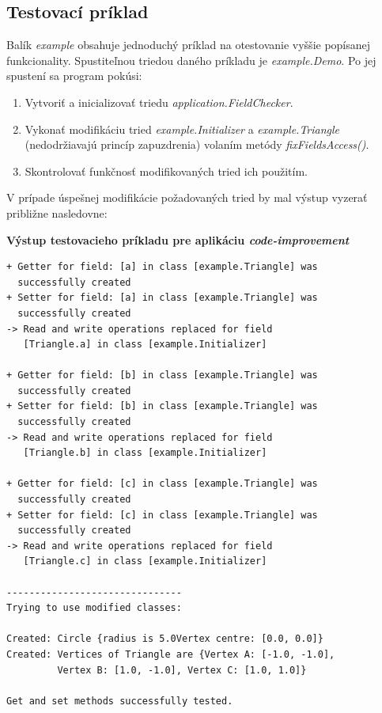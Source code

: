 \documentclass[11pt,final,oneside]{fithesis}
\newenvironment{example}[1]
{
\vspace{3mm}
\noindent\textbf{#1}
\vspace{2mm}
}
{
\vspace{3mm}
}
\begin{document}
\subsection{Testovací príklad}
Balík \textit{example} obsahuje jednoduchý príklad na otestovanie vyššie 
popísanej funkcionality. Spustiteľnou triedou daného príkladu je 
\textit{example.Demo}. Po jej spustení sa program pokúsi:

\begin{enumerate}
\item Vytvoriť a inicializovať triedu \textit{application.FieldChecker}.
\item Vykonať modifikáciu tried \textit{example.Initializer} a 
\textit{example.Triangle} (nedodržiavajú princíp zapuzdrenia) volaním metódy 
\textit{fixFieldsAccess()}.
\item Skontrolovať funkčnosť modifikovaných tried ich použitím.
\end{enumerate}

V prípade úspešnej modifikácie požadovaných tried by mal výstup vyzerať približne nasledovne:

\begin{example}{Výstup testovacieho príkladu pre aplikáciu
\textit{code-improvement}}
\begin{verbatim}
+ Getter for field: [a] in class [example.Triangle] was
  successfully created
+ Setter for field: [a] in class [example.Triangle] was
  successfully created
-> Read and write operations replaced for field
   [Triangle.a] in class [example.Initializer]

+ Getter for field: [b] in class [example.Triangle] was
  successfully created
+ Setter for field: [b] in class [example.Triangle] was
  successfully created
-> Read and write operations replaced for field
   [Triangle.b] in class [example.Initializer]

+ Getter for field: [c] in class [example.Triangle] was
  successfully created
+ Setter for field: [c] in class [example.Triangle] was
  successfully created
-> Read and write operations replaced for field
   [Triangle.c] in class [example.Initializer]

-------------------------------
Trying to use modified classes: 

Created: Circle {radius is 5.0Vertex centre: [0.0, 0.0]}
Created: Vertices of Triangle are {Vertex A: [-1.0, -1.0],
         Vertex B: [1.0, -1.0], Vertex C: [1.0, 1.0]}

Get and set methods successfully tested.
\end{verbatim}
\end{example}
\end{document}
